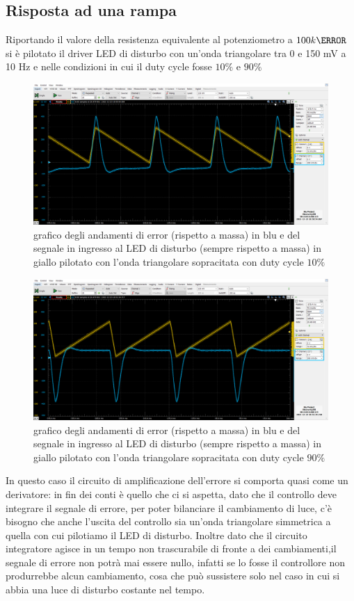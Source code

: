 \documentclass[10pt, a4paper, italian]{article}
\begin{document}
\subsection{Risposta ad una rampa}
Riportando il valore della resistenza equivalente al potenziometro a $100 k\ohm$ si è pilotato il driver LED di disturbo con un'onda triangolare tra 0 e 150 mV a 10 Hz e nelle condizioni in cui il duty cycle fosse $10 \percent$ e $90 \percent$
\begin{figure}[H]
    \centering
	\includegraphics[scale=0.4]{8}
    \caption{grafico degli andamenti di error (rispetto a massa) in blu e del segnale in ingresso al LED di disturbo (sempre rispetto a massa) in giallo pilotato con l'onda triangolare sopracitata con duty cycle $10 \percent$
    \label{fig: Draft1}}
\end{figure}

\begin{figure}[H]
    \centering
	\includegraphics[scale=0.4]{8.1}
    \caption{grafico degli andamenti di error (rispetto a massa) in blu e del segnale in ingresso al LED di disturbo (sempre rispetto a massa) in giallo pilotato con l'onda triangolare sopracitata con duty cycle $90 \percent$
    \label{fig: Draft1}}
\end{figure}
In questo caso il circuito di amplificazione dell'errore si comporta quasi come un derivatore: in fin dei conti è quello che ci si aspetta, dato che il controllo deve integrare il segnale di errore, per poter bilanciare il cambiamento di luce, c'è bisogno che anche l'uscita del controllo sia un'onda triangolare simmetrica a quella con cui pilotiamo il LED di disturbo. Inoltre dato che il circuito integratore agisce in un tempo non trascurabile di fronte a dei cambiamenti,il segnale di errore non potrà mai essere nullo, infatti se lo fosse il controllore non produrrebbe alcun cambiamento, cosa che può sussistere solo nel caso in cui si abbia una luce di disturbo costante nel tempo.
\end{document}
